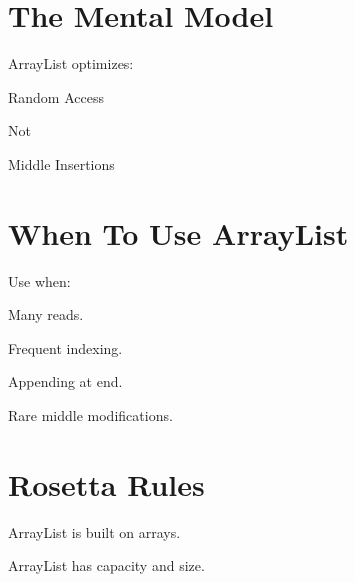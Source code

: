 \documentclass[11pt,a4paper]{book}
\begin{document}

\section{The Mental Model}

ArrayList optimizes:


Random Access


Not


Middle Insertions


\section{When To Use ArrayList}

Use when:


Many reads.


Frequent indexing.


Appending at end.


Rare middle modifications.


\section{Rosetta Rules}

\begin{rosettarule}

ArrayList is built on arrays.

\end{rosettarule}


\begin{rosettarule}

ArrayList has capacity
and size.

\end{rosettarule}
\end{document}

